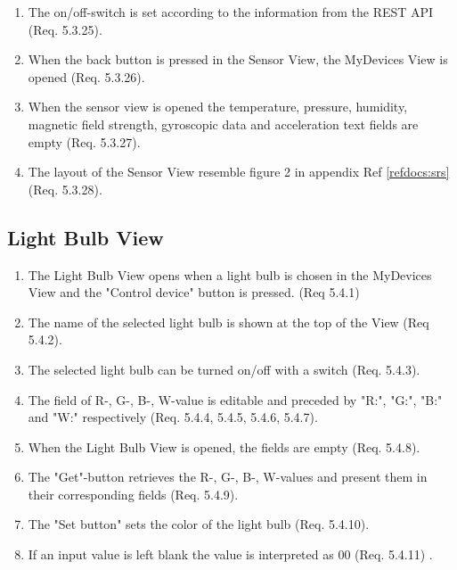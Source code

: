 \documentclass[a4paper]{article}
\newlength{\testlabellength}
\newenvironment{testlist}{\begin{enumerate}[label=\bfseries Test \thesubsection.\arabic* , labelindent=0pt, labelwidth=\testlabellength , leftmargin=2cm]}{\end{enumerate}}
\begin{document}
\begin{appendices}
\begin{testlist}
\item The on/off-switch is set according to the information from the REST API (Req. 5.3.25).

\item When the back button is pressed in the Sensor View, the MyDevices View is opened (Req. 5.3.26).

\item When the sensor view is opened the temperature, pressure, humidity, magnetic field strength, gyroscopic data and acceleration text fields are empty (Req. 5.3.27).

\item The layout of the Sensor View resemble figure 2 in appendix  Ref \ref{refdocs:srs} (Req. 5.3.28).

\end{testlist}

\subsection{Light Bulb View}
\begin{testlist}
	\item The Light Bulb View opens when a light bulb is chosen in the MyDevices View and the "Control device" button is pressed. (Req 5.4.1)
	
	\item The name of the selected light bulb is shown at the top of the View (Req 5.4.2).
  
    \item The selected light bulb can be turned on/off with a switch (Req. 5.4.3). 
    
    \item The field of R-, G-, B-, W-value is editable and preceded by "R:", "G:", "B:" and "W:" respectively (Req. 5.4.4, 5.4.5, 5.4.6, 5.4.7). 
    
	\item When the Light Bulb View is opened, the fields are empty (Req. 5.4.8).

	\item The "Get"-button retrieves the R-, G-, B-, W-values and present them in their corresponding fields (Req. 5.4.9). 

	\item The "Set button" sets the color of the light bulb (Req. 5.4.10).

	\item If an input value is left blank the value is interpreted as 00 (Req. 5.4.11) .   
    

\end{testlist}
\end{appendices}
\end{document}

